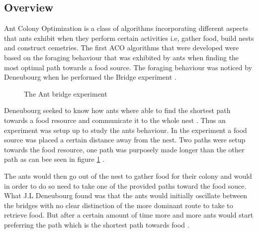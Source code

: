 \subsection{Overview}
Ant Colony Optimization is a class of algorithms incorporating different aspects that ants exhibit when they perform certain activities i.e, gather food, build nests and construct cemetries. The first ACO algorithms that were developed were based on the foraging behaviour that was exhibited by ants when finding the most optimal path towards a food source. The foraging behaviour was noticed by Deneubourg when he performed the Bridge experiment \cite{AntsAndStigmergy,CompuIntelligenceIntro}.
\begin{figure}[b!]
	\centering
	\setlength \fboxsep{0pt}
	\setlength \fboxrule{0.5pt}
	\caption{The Ant bridge experiment}
	\label{fig:antBridgeExperiment}
\end{figure}

Deneubourg seeked to know how ants where able to find the shortest path towards a food resource and communicate it to the whole nest \cite{AntsAndStigmergy}. Thus an experiment was setup up to study the ants behaviour. In the experiment a food source was placed a certain distance away from the nest. Two paths were setup towards the food resource, one path was purposely made longer than the other path as can bee seen in figure \ref{fig:antBridgeExperiment} \cite{AntsAndStigmergy}.

The ants would then go out of the nest to gather food for their colony and would in order to do so need to take one of the provided paths toward the food souce. What J.L Deneubourg found was that the ants would initially oscillate between the bridges with no clear distinction of the more dominant route to take to retrieve food. But after a certain amount of time more and more ants would start preferring the path which is the shortest path towards food \cite{AntsAndStigmergy}.

